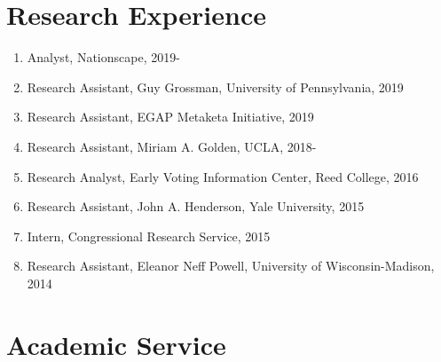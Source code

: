 \documentclass[11pt]{article}
\begin{document}
\section*{Research Experience}
 
\begin{enumerate}[topsep = 0pt, itemsep = 1ex, partopsep  = 1ex, parsep = 1ex]

	\item[] Analyst, Nationscape, 2019-

	\item[] Research Assistant, Guy Grossman, University of Pennsylvania, 2019
	
	\item[] Research Assistant, EGAP Metaketa Initiative, 2019
	
	\item[] Research Assistant, Miriam A. Golden, UCLA, 2018-
	
	\item[] Research Analyst, Early Voting Information Center, Reed College, 2016
	
	\item[] Research Assistant, John A. Henderson, Yale University, 2015
	
	\item[] Intern, Congressional Research Service, 2015
	
	\item[] Research Assistant, Eleanor Neff Powell, University of Wisconsin-Madison, 2014
	
\end{enumerate}

\section*{Academic Service} 
\end{document}
